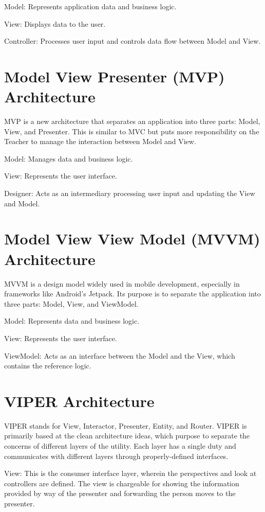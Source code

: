 \documentclass[conference]{IEEEtran}
\begin{document}
Model: Represents application data and business logic.

View: Displays data to the user.

Controller: Processes user input and controls data flow between Model and View.

\section{Model View Presenter (MVP) Architecture}
MVP is a new architecture that separates an application into three parts: Model, View, and Presenter. This is similar to MVC but puts more responsibility on the Teacher to manage the interaction between Model and View.

Model: Manages data and business logic.

View: Represents the user interface.

Designer: Acts as an intermediary processing user input and updating the View and Model.

\section{Model View View Model (MVVM) Architecture}
MVVM is a design model widely used in mobile development, especially in frameworks like Android’s Jetpack. Its purpose is to separate the application into three parts: Model, View, and ViewModel.

Model: Represents data and business logic.

View: Represents the user interface.

ViewModel: Acts as an interface between the Model and the View, which contains the reference logic.

\section{VIPER Architecture}
VIPER stands for View, Interactor, Presenter, Entity, and Router. VIPER is primarily based at the clean architecture ideas, which purpose to separate the concerns of different layers of the utility. Each layer has a single duty and communicates with different layers through properly-defined interfaces.

View: This is the consumer interface layer, wherein the perspectives and look at controllers are defined. The view is chargeable for showing the information provided by way of the presenter and forwarding the person moves to the presenter.
\end{document}
